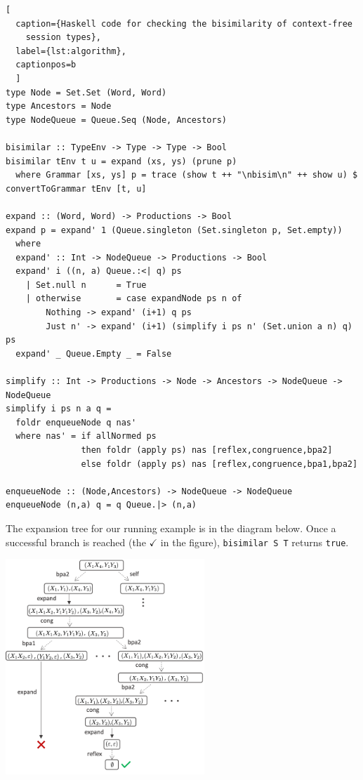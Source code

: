 \begin{lstlisting}[
  caption={Haskell code for checking the bisimilarity of context-free
    session types},
  label={lst:algorithm},
  captionpos=b
  ]
type Node = Set.Set (Word, Word)
type Ancestors = Node
type NodeQueue = Queue.Seq (Node, Ancestors)

bisimilar :: TypeEnv -> Type -> Type -> Bool
bisimilar tEnv t u = expand (xs, ys) (prune p)
  where Grammar [xs, ys] p = trace (show t ++ "\nbisim\n" ++ show u) $ convertToGrammar tEnv [t, u]
        
expand :: (Word, Word) -> Productions -> Bool
expand p = expand' 1 (Queue.singleton (Set.singleton p, Set.empty))
  where
  expand' :: Int -> NodeQueue -> Productions -> Bool
  expand' i ((n, a) Queue.:<| q) ps
    | Set.null n      = True
    | otherwise       = case expandNode ps n of
        Nothing -> expand' (i+1) q ps
        Just n' -> expand' (i+1) (simplify i ps n' (Set.union a n) q) ps
  expand' _ Queue.Empty _ = False

simplify :: Int -> Productions -> Node -> Ancestors -> NodeQueue -> NodeQueue
simplify i ps n a q =
  foldr enqueueNode q nas'
  where nas' = if allNormed ps
               then foldr (apply ps) nas [reflex,congruence,bpa2]
               else foldr (apply ps) nas [reflex,congruence,bpa1,bpa2]

enqueueNode :: (Node,Ancestors) -> NodeQueue -> NodeQueue
enqueueNode (n,a) q = q Queue.|> (n,a)
\end{lstlisting}

\begin{example}
  The expansion tree for our running example is
  in the diagram below. Once a successful
  branch is reached (the $\checkmark$ in the figure), 
  \lstinline|bisimilar S T| returns \lstinline|true|.
\end{example}

\begin{center}
	\includegraphics[width=7.5cm]{img/expansionTree}
\end{center}

